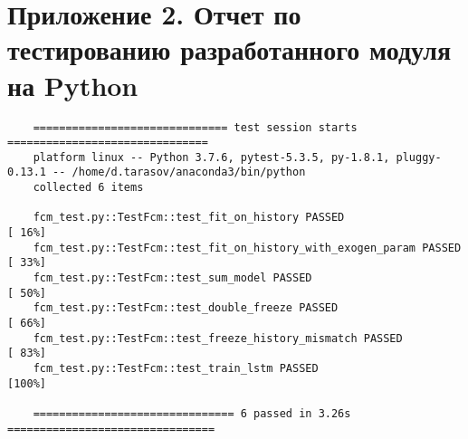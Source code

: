 ﻿\chapter{Приложение 2. Отчет по тестированию разработанного модуля на Python}
\label{listing:test_report}

\begin{lstlisting}
    ============================== test session starts ===============================
    platform linux -- Python 3.7.6, pytest-5.3.5, py-1.8.1, pluggy-0.13.1 -- /home/d.tarasov/anaconda3/bin/python
    collected 6 items
    
    fcm_test.py::TestFcm::test_fit_on_history PASSED                           [ 16%]
    fcm_test.py::TestFcm::test_fit_on_history_with_exogen_param PASSED         [ 33%]
    fcm_test.py::TestFcm::test_sum_model PASSED                                [ 50%]
    fcm_test.py::TestFcm::test_double_freeze PASSED                            [ 66%]
    fcm_test.py::TestFcm::test_freeze_history_mismatch PASSED                  [ 83%]
    fcm_test.py::TestFcm::test_train_lstm PASSED                               [100%]
    
    =============================== 6 passed in 3.26s ================================
\end{lstlisting}

